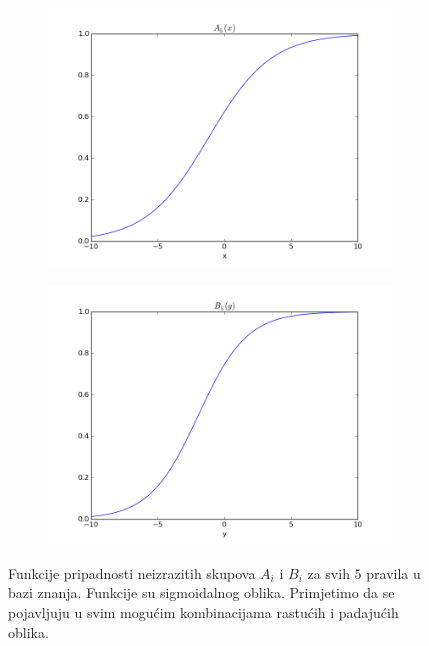 \documentclass[paper=a4, fontsize=11pt]{scrartcl} %
\numberwithin{equation}{section} %
\numberwithin{figure}{section} %
\numberwithin{table}{section} %
\begin{document}
\begin{figure}[h]
\begin{subfigure}[b]{0.45\textwidth}
\includegraphics[width=\textwidth]{img/figure_9.png}
\end{subfigure}
\begin{subfigure}[b]{0.45\textwidth}
\includegraphics[width=\textwidth]{img/figure_10.png}
\end{subfigure}
\caption{Funkcije pripadnosti neizrazitih skupova $A_i$ i $B_i$ za svih $5$ pravila u bazi znanja. Funkcije su sigmoidalnog oblika. Primjetimo da se pojavljuju u svim mogućim kombinacijama rastućih i padajućih oblika.}
\end{figure}
\end{document}
